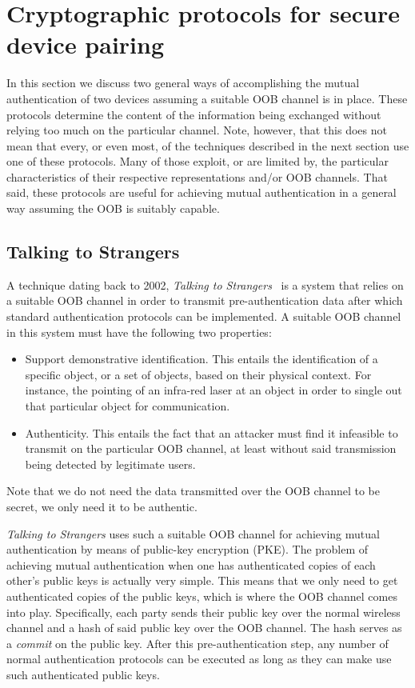\documentclass[conference, 11pt]{sty/IEEEtran}
\begin{document}
\section{Cryptographic protocols for secure device pairing}
\label{sec:cryptographic_protocols_for_secure_device_pairing}

In this section we discuss two general ways of accomplishing the mutual authentication of two devices assuming a suitable OOB channel is in place.
These protocols determine the content of the information being exchanged without relying too much on the particular channel.
Note, however, that this does not mean that every, or even most, of the techniques described in the next section use one of these protocols.
Many of those exploit, or are limited by, the particular characteristics of their respective representations and/or OOB channels.
That said, these protocols are useful for achieving mutual authentication in a general way assuming the OOB is suitably capable.

\subsection{Talking to Strangers}
\label{ssec:talking_to_strangers}

A technique dating back to 2002, \emph{Talking to Strangers}~\cite{balfanz2002talking} is a system that relies on a suitable OOB channel in order to transmit pre-authentication data after which standard authentication protocols can be implemented.
A suitable OOB channel in this system must have the following two properties:

\begin{itemize}
    \item Support demonstrative identification.
        This entails the identification of a specific object, or a set of objects, based on their physical context.
        For instance, the pointing of an infra-red laser at an object in order to single out that particular object for communication.
    \item Authenticity.
        This entails the fact that an attacker must find it infeasible to transmit on the particular OOB channel, at least without said transmission being detected by legitimate users.
\end{itemize}

Note that we do not need the data transmitted over the OOB channel to be secret, we only need it to be authentic.

\emph{Talking to Strangers} uses such a suitable OOB channel for achieving mutual authentication by means of public-key encryption (PKE).
The problem of achieving mutual authentication when one has authenticated copies of each other's public keys is actually very simple.
This means that we only need to get authenticated copies of the public keys, which is where the OOB channel comes into play.
Specifically, each party sends their public key over the normal wireless channel and a hash of said public key over the OOB channel.
The hash serves as a \emph{commit} on the public key.
After this pre-authentication step, any number of normal authentication protocols can be executed as long as they can make use such authenticated public keys.
\end{document}
